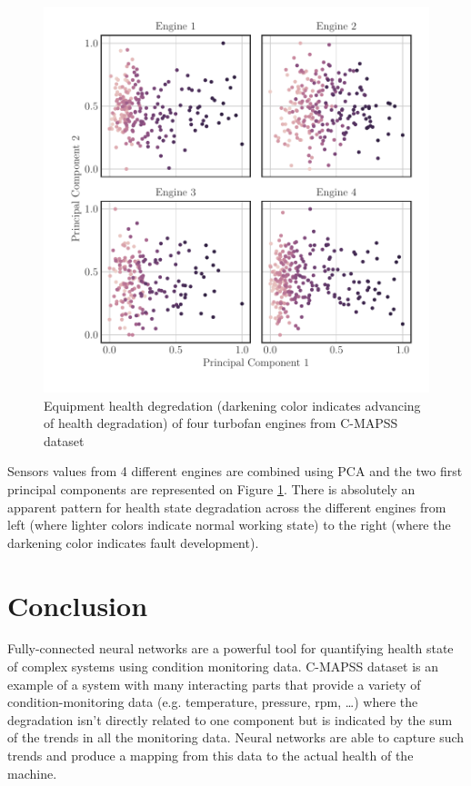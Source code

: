 \begin{figure}[h]
    \centering
    \includegraphics[width=.9\linewidth]{figures/plots/pc-degradation.pdf}
    \caption{Equipment health degredation (darkening color indicates advancing of health degradation) of four turbofan engines from C-MAPSS dataset}
    \label{fig:pca-degradation}
\end{figure}

Sensors values from 4 different engines are combined using PCA and the two first principal components are represented on Figure \ref{fig:pca-degradation}. There is absolutely an apparent pattern for health state degradation across the different engines from left (where lighter colors indicate normal working state) to the right (where the darkening color indicates fault development).

\section{Conclusion}
Fully-connected neural networks are a powerful tool for quantifying health state of complex systems using condition monitoring data. C-MAPSS dataset is an example of a system with many interacting parts that provide a variety of condition-monitoring data (e.g. temperature, pressure, rpm, …) where the degradation isn't directly related to one component but is indicated by the sum of the trends in all the monitoring data. Neural networks are able to capture such trends and produce a mapping from this data to the actual health of the machine.
